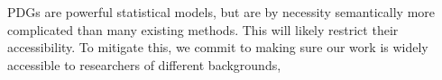 \documentclass{article}
\theoremstyle{plain}
\theoremstyle{definition}
\theoremstyle{remark}
\numberwithin{equation}{section}
\begin{document}
PDGs are powerful statistical models, but are by necessity
semantically more complicated than many existing methods. This will
likely restrict their accessibility. To mitigate this, we commit to
making sure our work is widely accessible to researchers of different
backgrounds,
        
\begin{ack}
\end{ack}

{
    \small
    
            
}
%
%
%


\end{document}

